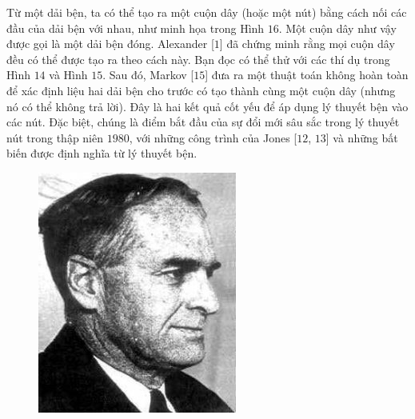 \begin{multicols}{2}
\begin{figure}[H]
	\end{figure}
	Từ một dải bện, ta có thể tạo ra một cuộn dây (hoặc một nút) bằng cách nối các đầu của dải bện với nhau, như minh họa trong Hình $16$. Một cuộn dây như vậy được gọi là một dải bện đóng. Alexander [$1$] đã chứng minh rằng mọi cuộn dây đều có thể được tạo ra theo cách này. Bạn đọc có thể thử với các thí dụ trong Hình $14$ và Hình $15$. Sau đó, Markov [$15$] đưa ra một thuật toán không hoàn toàn để xác định liệu hai dải bện cho trước có tạo thành cùng một cuộn dây (nhưng nó có thể không trả lời). Đây là hai kết quả cốt yếu để áp dụng lý thuyết bện vào các nút. Đặc biệt, chúng là điểm bắt đầu của sự đổi mới sâu sắc trong lý thuyết nút trong thập niên $1980$, với những công trình của Jones [$12$, $13$] và những bất biến được định nghĩa từ lý thuyết bện.
	\vskip 0.01cm
	\begin{tBox}
		\begin{figure}
			\vspace*{-15pt}
			\centering
			\captionsetup{labelformat= empty, justification=centering}
			\hspace*{2pt}\includegraphics[width= 1.1\linewidth]{fig_Alexander}

\end{figure}
\end{tBox}
\end{multicols}
